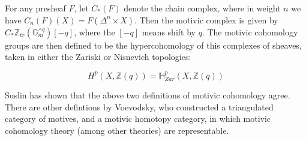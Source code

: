 \documentclass[12pt]{article}
\begin{document}
For any presheaf $F$, let $C_*(F)$ denote the chain complex, where in weight $n$ we have $C_n(F)(X) = F(\Delta^n \times X)$. Then the motivic complex is given by $C_*\mathbb{Z}_{tr}(\mathbb{G}_m^{\wedge q})[-q]$, where the $[-q]$ means shift by $q$. The motivic cohomology groups are then defined to be the hypercohomology of this complexes of sheaves, taken in either the Zariski or Nisnevich topologies:

$$ H^p(X,\mathbb{Z}(q)) = \mathbb{H}^p_{Zar}(X,\mathbb{Z}(q))$$

Suslin has shown that the above two definitions of motivic cohomology agree. There are other defintions by Voevodsky, who constructed a triangulated category of motives, and a motivic homotopy category, in which motivic cohomology theory (among other theories) are representable.


\end{document}
